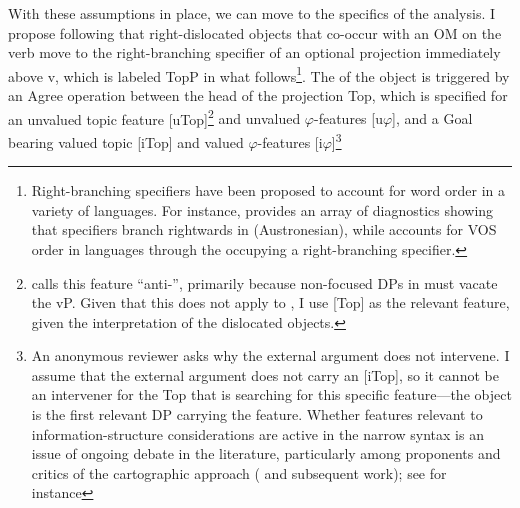 \documentclass[output=paper
,newtxmath
,modfonts
,nonflat]{langsci/langscibook}
\begin{document}
\textup{With these assumptions in place, we can move to the specifics of the analysis. I propose following \citet{Zeller2015} that right-dislocated objects that co-occur with an OM on the verb move to the right-branching specifier of an optional projection immediately above} v\textup{, which is labeled TopP in what follows}\footnote{Right-branching specifiers have been proposed to account for word order in a variety of languages. For instance, \citet{Chung1998} provides an array of diagnostics showing that specifiers branch rightwards in  (Austronesian), while \citet{Aissen1992} accounts for VOS order in  languages through the  occupying a right-branching specifier.}\textup{. The  of the object is triggered by an Agree operation between the head of the projection Top, which is specified for an unvalued topic feature [uTop]}\footnote{\citet{Zeller2015} calls this feature “anti-”, primarily because non-focused DPs in  must vacate the vP. Given that this does not apply to , I use [Top] as the relevant feature, given the interpretation of the dislocated objects.} \textup{and unvalued $\varphi $-features [u$\varphi $], and a Goal bearing valued topic [iTop] and valued $\varphi $-features [i$\varphi $]}\footnote{An anonymous reviewer asks why the external argument does not intervene. I assume that the external argument does not carry an [iTop], so it cannot be an intervener for the Top that is searching for this specific feature—the object is the first relevant DP carrying the feature. Whether features relevant to information-structure considerations are active in the narrow syntax is an issue of ongoing debate in the literature, particularly among proponents and critics of the cartographic approach (\citealt{rizzi1997} and subsequent work); see for instance 
}
\end{document}
